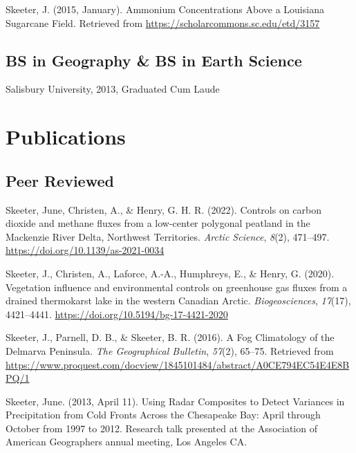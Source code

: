\documentclass[
]{article}
\newlength{\cslhangindent}
\newlength{\cslentryspacingunit} %
\newenvironment{CSLReferences}[2] %
 {%
  \setlength{\parindent}{0pt}
  \ifodd #1
  \let\oldpar\par
  \def\par{\hangindent=\cslhangindent\oldpar}
  \fi
  \setlength{\parskip}{#2\cslentryspacingunit}
 }%
 {}
\begin{document}
\hypertarget{refs-2.2}{}
\begin{CSLReferences}{1}{0}
\leavevmode{}%
Skeeter, J. (2015, January). Ammonium {Concentrations} {Above} a
{Louisiana} {Sugarcane} {Field}. Retrieved from
\url{https://scholarcommons.sc.edu/etd/3157}

\end{CSLReferences}

\hypertarget{bs-in-geography-bs-in-earth-science}{%
\subsection{BS in Geography \& BS in Earth
Science}\label{bs-in-geography-bs-in-earth-science}}

Salisbury University, 2013, Graduated Cum Laude

\hypertarget{publications}{%
\section{Publications}\label{publications}}

\hypertarget{peer-reviewed}{%
\subsection{Peer Reviewed}\label{peer-reviewed}}

\hypertarget{refs-3.1}{}
\begin{CSLReferences}{1}{0}
\leavevmode{}%
Skeeter, June, Christen, A., \& Henry, G. H. R. (2022). Controls on
carbon dioxide and methane fluxes from a low-center polygonal peatland
in the {Mackenzie} {River} {Delta}, {Northwest} {Territories}.
\emph{Arctic Science}, \emph{8}(2), 471--497.
\url{https://doi.org/10.1139/as-2021-0034}

\leavevmode{}%
Skeeter, J., Christen, A., Laforce, A.-A., Humphreys, E., \& Henry, G.
(2020). Vegetation influence and environmental controls on greenhouse
gas fluxes from a drained thermokarst lake in the western {Canadian}
{Arctic}. \emph{Biogeosciences}, \emph{17}(17), 4421--4441.
\url{https://doi.org/10.5194/bg-17-4421-2020}

\leavevmode{}%
Skeeter, J., Parnell, D. B., \& Skeeter, B. R. (2016). A {Fog}
{Climatology} of the {Delmarva} {Peninsula}. \emph{The Geographical
Bulletin}, \emph{57}(2), 65--75. Retrieved from
\url{https://www.proquest.com/docview/1845101484/abstract/A0CE794EC54E4E8BPQ/1}

\leavevmode{}%
Skeeter, June. (2013, April 11). Using {Radar} {Composites} to {Detect}
{Variances} in {Precipitation} from {Cold} {Fronts} {Across} the
{Chesapeake} {Bay}: {April} through {October} from 1997 to 2012.
Research talk presented at the Association of American Geographers
annual meeting, Los Angeles CA.

\end{CSLReferences}
\end{document}
